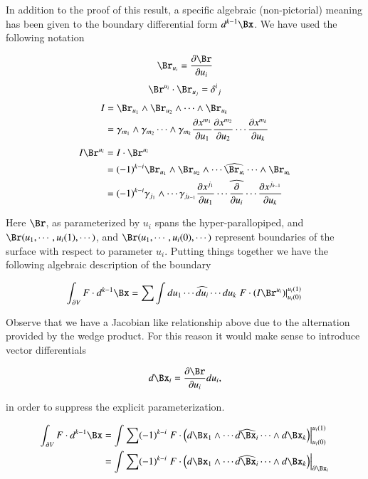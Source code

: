 \documentclass{article}
\newcommand{\PD}[2]{\frac{\partial {#2}}{\partial {#1}}}
\begin{document}
In addition to the proof of this result, a specific algebraic (non-pictorial) meaning has been given to the boundary
differential form $d^{k-1}\Bx$.  We have used the following notation

\begin{equation}
\Br_{u_i} = \PD{u_i}{\Br}
\end{equation}
\begin{equation}
\Br^{u_i} \cdot \Br_{u_j} = {\delta^i}_j
\end{equation}
\begin{align}
I &= \Br_{u_1} \wedge \Br_{u_2} \wedge \cdots \wedge \Br_{u_k} \\
  &= \gamma_{m_1} \wedge \gamma_{m_2} \cdots \wedge \gamma_{m_{k}} \PD{u_1}{x^{m_1}} \PD{u_2}{x^{m_2}} \cdots \PD{u_k}{x^{m_k}} \\
\end{align}
\begin{align*}
I \Br^{u_i} &= I \cdot \Br^{u_i} \\
&= (-1)^{k-i} \Br_{u_1} \wedge \Br_{u_2} \wedge \cdots \widehat{\Br_{u_i}} \cdots \wedge \Br_{u_k} \\
&= (-1)^{k-i} 
\gamma_{j_1} \wedge \cdots \gamma_{j_{k-1}} 
\PD{u_1}{x^{j_1}} \cdots \widehat{\PD{u_i}{}} \cdots \PD{u_k}{x^{j_{k-1}}}
\end{align*}

Here $\Br$, as parameterized by $u_i$ spans the hyper-parallopiped, and 
$\Br(u_1, \cdots, u_i(1), \cdots)$, and $\Br(u_1, \cdots, u_i(0), \cdots)$ represent boundaries of the surface with respect to
parameter $u_i$.  Putting things together we have the following algebraic description of the boundary

\begin{equation}
\int_{\partial V} F \cdot d^{k-1}\Bx 
= \sum \int du_1 \cdots \widehat{du_i} \cdots du_k \left.{F \cdot (I \Br^{u_i})}\right\vert_{u_i(0)}^{u_i(1)} \\
\end{equation}

Observe that we have a Jacobian like relationship above due to the alternation provided by the wedge product.  For this
reason it would make sense to introduce vector differentials

\begin{equation}
d\Bx_i = \PD{u_i}{\Br} du_i,
\end{equation}

in order to suppress the explicit parameterization.

\begin{align}
\int_{\partial V} F \cdot d^{k-1}\Bx 
&=
 \int \sum (-1)^{k-i}
\left.{F \cdot 
\left( d\Bx_1 \wedge \cdots \widehat{d\Bx_i} \cdots \wedge d\Bx_k \right)
}\right\vert_{u_i(0)}^{u_i(1)} \\
&=
\int \sum (-1)^{k-i}
\left.{F \cdot 
\left( d\Bx_1 \wedge \cdots \widehat{d\Bx_i} \cdots \wedge d\Bx_k \right)
}\right\vert_{\partial \Bx_i}
\end{align}
\end{document}

